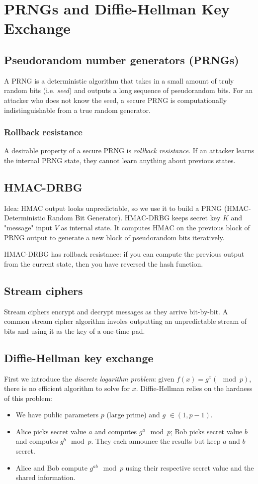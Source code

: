 \chapter{PRNGs and Diffie-Hellman Key Exchange}

\section{Pseudorandom number generators (PRNGs)}
A PRNG is a deterministic algorithm that takes in a small amount of truly random bits (i.e. \emph{seed}) and outputs a long sequence of pseudorandom bits. For an attacker who does not know the seed, a secure PRNG is computationally indistinguishable from a true random generator.

\subsection{Rollback resistance}
A desirable property of a secure PRNG is \emph{rollback resistance}. If an attacker learns the internal PRNG state, they cannot learn anything about previous states.

\section{HMAC-DRBG}
Idea: HMAC output looks unpredictable, so we use it to build a PRNG (HMAC-Deterministic Random Bit Generator). HMAC-DRBG keeps secret key $K$ and "message" input $V$ as internal state. It computes HMAC on the previous block of PRNG output to generate a new block of pseudorandom bits iteratively. 

\medskip

HMAC-DRBG has rollback resistance: if you can compute the previous output from the current state, then you have reversed the hash function.

\section{Stream ciphers}
Stream ciphers encrypt and decrypt messages as they arrive bit-by-bit. A common stream cipher algorithm involes outputting an unpredictable stream of bits and using it as the key of a one-time pad.

\section{Diffie-Hellman key exchange}
First we introduce the \emph{discrete logarithm problem}: given $f(x) = g^x (\mod p)$, there is no efficient algorithm to solve for $x$. Diffie-Hellman relies on the hardness of this problem:
\begin{itemize}
    \item We have public parameters $p$ (large prime) and $g$ $\in (1, p-1)$.
    \item Alice picks secret value $a$ and computes $g^a \mod p$; Bob picks secret value $b$ and computes $g^b \mod p$. They each announce the results but keep $a$ and $b$ secret.
    \item Alice and Bob compute $g^{ab} \mod p$ using their respective secret value and the shared information.
\end{itemize} 

